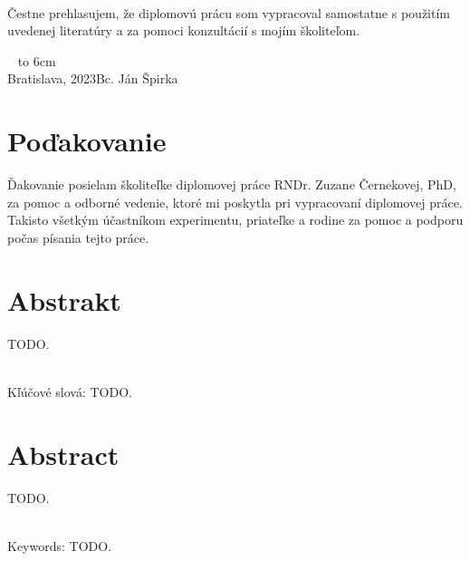 \documentclass[12pt, a4paper, oneside]{book}
\newcommand\mfauthor{Bc. Ján Špirka}
\newcommand\mfplacedate{Bratislava, 2023}
\begin{document}
\noindent
\begin{minipage}{0.25\textwidth}~\end{minipage}
\begin{minipage}{0.75\textwidth}
Čestne prehlasujem, že diplomovú prácu som vypracoval samostatne s použitím uvedenej literatúry a za pomoci konzultácií s mojím školiteľom.
\newline \newline
\end{minipage}
\vfill
~ \hfill {\hbox to 6cm{\dotfill}} \\
\mfplacedate \hfill \mfauthor
\vfill\eject 



\chapter*{Poďakovanie}\label{chap:thank_you}
Ďakovanie posielam školiteľke diplomovej práce RNDr. Zuzane Černekovej, PhD, za pomoc a odborné vedenie, ktoré mi poskytla pri vypracovaní  diplomovej práce. Takisto všetkým účastníkom experimentu, priateľke a rodine za pomoc a podporu počas písania tejto práce.
\vfill\eject 


\chapter*{Abstrakt}\label{chap:abstract_sk}
TODO.

~\\
Kľúčové slová: TODO.
\vfill\eject 



\chapter*{Abstract}\label{chap:abstract_en}
TODO.

~\\
Keywords: TODO.
\vfill\eject 



\newpage
\tableofcontents
\end{document}
